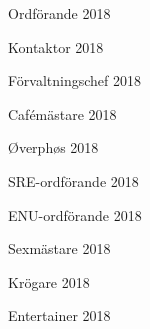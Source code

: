 \documentclass[../_main/handlingar.tex]{subfiles}
\begin{document}
\newpage
\begin{signatures}{10}
    \mvh
    \signature{Daniel Bakic}{Ordförande 2018}
    \signature{Axel Voss}{Kontaktor 2018}
    \signature{Magnus Lundh}{Förvaltningschef 2018}
    \signature{Elin Johansson}{Cafémästare 2018}
    \signature{Andreas Bennström}{Øverphøs 2018}
    \signature{Fanny Månefjord}{SRE-ordförande 2018}
    \signature{Isabella Hansen}{ENU-ordförande 2018}
    \signature{Alexander Wik}{Sexmästare 2018}
    \signature{Malin Heyden}{Krögare 2018}
    \signature{Adam Belfrage}{Entertainer 2018}
\end{signatures}
\end{document}
